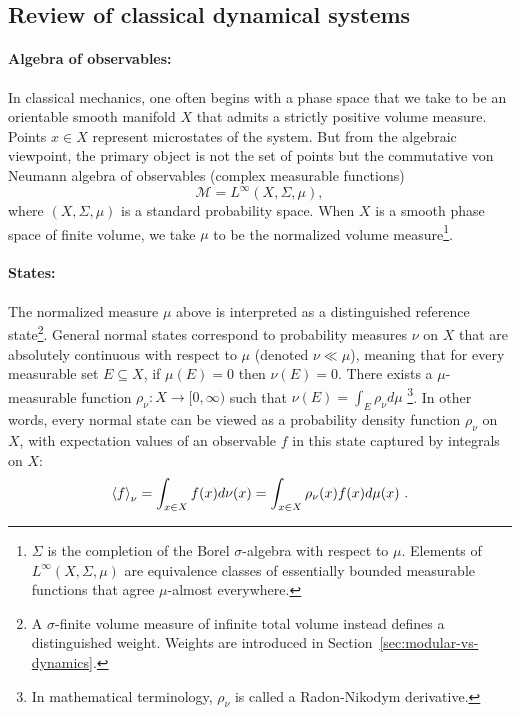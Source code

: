 \documentclass[a4paper,11pt]{article}
\theoremstyle{definition}
\newcommand{\mM}{\mathcal{M}}
\begin{document}
\subsection{Review of classical dynamical systems}\label{subsec:classical-definitions}

\paragraph{Algebra of observables:} In classical mechanics, one often begins with a phase space that we take to be an orientable smooth manifold \(X\) that admits a strictly positive volume measure. Points \(x\in X\) represent microstates of the system. But from the algebraic viewpoint, the primary object is not the set of points but the commutative von Neumann algebra of observables (complex measurable functions)
\[
\mM=L^\infty(X,\Sigma,\mu),
\]
where \((X,\Sigma,\mu)\) is a standard probability space. When $X$ is a smooth phase space of finite volume, we take $\mu$ to be the normalized volume measure\footnote{$\Sigma$ is the completion of the Borel $\sigma$-algebra with respect to $\mu$. Elements of $L^\infty(X,\Sigma,\mu)$ are equivalence classes of essentially bounded measurable functions that agree $\mu$-almost everywhere.}.


\paragraph{States:} The normalized measure $\mu$ above is interpreted as a distinguished reference state\footnote{A $\sigma$-finite volume measure of infinite total volume instead defines a distinguished weight. Weights are introduced in Section~\ref{sec:modular-vs-dynamics}.}. General normal states correspond to probability measures $\nu$ on $X$ that are absolutely continuous with respect to $\mu$ (denoted $\nu\ll \mu$), meaning that for every measurable set $E\subseteq X$, if $\mu(E)=0$ then $\nu(E)=0$.
There exists a $\mu$-measurable function $\rho_\nu:X\to [0,\infty)$ such that $\nu(E)=\int_E \rho_\nu d\mu$ \footnote{In mathematical terminology, $\rho_\nu$ is called a Radon-Nikodym derivative.}. In other words, every normal state can be viewed as a probability density function $\rho_\nu$ on $X$, with expectation values of an observable $f$ in this state captured by integrals on $X$:
\begin{align}
\braket{f}_\nu=\int_{x\in X}f(x) d\nu(x)=\int_{x\in X} \rho_\nu(x) f(x) d\mu(x)\ .
\end{align}
\end{document}
